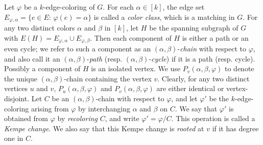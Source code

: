 \documentclass[11pt]{article}
\begin{document}
Let $\varphi$ be a $k$-edge-coloring of $G$. For each $\alpha \in [k]$, the edge set $E_{\varphi, \alpha}=\{e\in E:\, 
\varphi(e)=\alpha\}$ is called a {\em color class}\label{colorclass}, which is a matching in $G$.  For any two distinct colors 
$\alpha$ and $\beta$ in $[k]$, let $H$ be the spanning subgraph of $G$ with $E(H)=E_{\varphi, \alpha} 
\cup E_{\varphi, \beta}$. Then each component of $H$ is either a path or an even cycle; we refer to such a component 
as an $(\alpha, \beta)$-{\em chain} with respect to $\varphi$, and also call it an $(\alpha, \beta)$-{\em path} \label{alphabetapath}
(resp. $(\alpha, \beta)$-{\em cycle}) if it is a path (resp. cycle). Possibly a component of $H$ is an isolated
vertex. We use $P_v(\alpha, \beta, \varphi)$ to denote the unique $(\alpha, \beta)$-chain containing the vertex $v$. 
Clearly, for any two distinct vertices $u$ and $v$, $P_u(\alpha, \beta, \varphi)$ and $P_v(\alpha, \beta, \varphi)$ 
are either identical or vertex-disjoint. Let $C$ be an $(\alpha, \beta)$-chain with respect to $\varphi$, and let 
$\varphi'$ be the $k$-edge-coloring arising from $\varphi$ by interchanging $\alpha$ and $\beta$ on $C$. We say 
that $\varphi'$ is obtained from $\varphi$ by {\em recoloring} $C$, and write $\varphi'=\varphi /C$. This 
operation is called a {\em Kempe change}\label{kempe}. We also say that this Kempe change is {\em rooted} at $v$ if 
it has degree one in $C$. 
\end{document}
